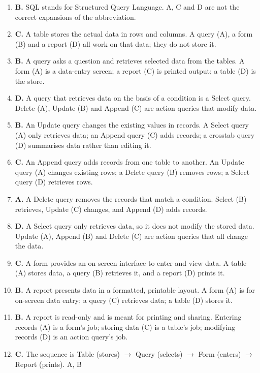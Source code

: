 \begin{enumerate}[label=\textbf{Q\arabic*.}, leftmargin=*]
\item \textbf{B.} SQL stands for Structured Query Language. A, C and D are
  not the correct expansions of the abbreviation.
\item \textbf{C.} A table stores the actual data in rows and columns. A
  query (A), a form (B) and a report (D) all work on that data; they do not
  store it.
\item \textbf{B.} A query asks a question and retrieves selected data from
  the tables. A form (A) is a data-entry screen; a report (C) is printed
  output; a table (D) is the store.
\item \textbf{D.} A query that retrieves data on the basis of a condition is
  a Select query. Delete (A), Update (B) and Append (C) are action queries
  that modify data.
\item \textbf{B.} An Update query changes the existing values in records. A
  Select query (A) only retrieves data; an Append query (C) adds records; a
  crosstab query (D) summarises data rather than editing it.
\item \textbf{C.} An Append query adds records from one table to another. An
  Update query (A) changes existing rows; a Delete query (B) removes rows; a
  Select query (D) retrieves rows.
\item \textbf{A.} A Delete query removes the records that match a condition.
  Select (B) retrieves, Update (C) changes, and Append (D) adds records.
\item \textbf{D.} A Select query only retrieves data, so it does not modify
  the stored data. Update (A), Append (B) and Delete (C) are action queries
  that all change the data.
\item \textbf{C.} A form provides an on-screen interface to enter and view
  data. A table (A) stores data, a query (B) retrieves it, and a report (D)
  prints it.
\item \textbf{B.} A report presents data in a formatted, printable layout. A
  form (A) is for on-screen data entry; a query (C) retrieves data; a table
  (D) stores it.
\item \textbf{B.} A report is read-only and is meant for printing and
  sharing. Entering records (A) is a form's job; storing data (C) is a
  table's job; modifying records (D) is an action query's job.
\item \textbf{C.} The sequence is Table (stores) $\rightarrow$ Query
  (selects) $\rightarrow$ Form (enters) $\rightarrow$ Report (prints). A, B

\end{enumerate}
